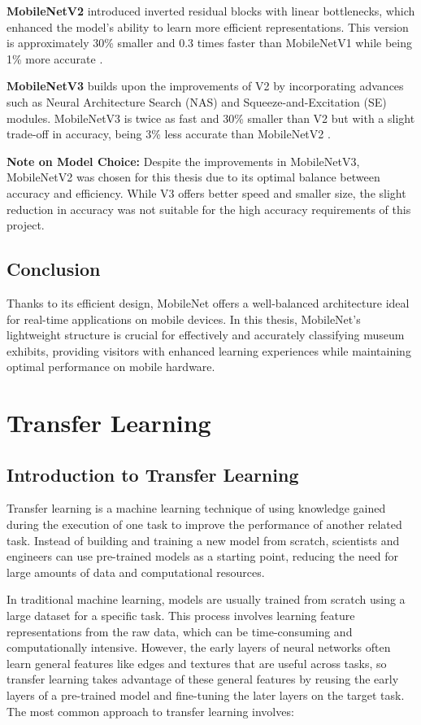 \textbf{MobileNetV2} introduced inverted residual blocks with linear bottlenecks, which enhanced the model's ability to learn more efficient representations. This version is approximately 30\% smaller and 0.3 times faster than MobileNetV1 while being 1\% more accurate \cite{pandrii_mobilenet}.

\textbf{MobileNetV3} builds upon the improvements of V2 by incorporating advances such as Neural Architecture Search (NAS) and Squeeze-and-Excitation (SE) modules. MobileNetV3 is twice as fast and 30\% smaller than V2 but with a slight trade-off in accuracy, being 3\% less accurate than MobileNetV2 \cite{pandrii_mobilenet}.

\textbf{Note on Model Choice:} Despite the improvements in MobileNetV3, MobileNetV2 was chosen for this thesis due to its optimal balance between accuracy and efficiency. While V3 offers better speed and smaller size, the slight reduction in accuracy was not suitable for the high accuracy requirements of this project.

\subsection{Conclusion}

Thanks to its efficient design, MobileNet offers a well-balanced architecture ideal for real-time applications on mobile devices. In this thesis, MobileNet's lightweight structure is crucial for effectively and accurately classifying museum exhibits, providing visitors with enhanced learning experiences while maintaining optimal performance on mobile hardware.

\section{Transfer Learning}

\subsection{Introduction to Transfer Learning}

Transfer learning is a machine learning technique of using knowledge gained during the execution of one task to improve the performance of another related task. Instead of building and training a new model from scratch, scientists and engineers can use pre-trained models as a starting point, reducing the need for large amounts of data and computational resources.

In traditional machine learning, models are usually trained from scratch using a large dataset for a specific task. This process involves learning feature representations from the raw data, which can be time-consuming and computationally intensive. However, the early layers of neural networks often learn general features like edges and textures that are useful across tasks, so transfer learning takes advantage of these general features by reusing the early layers of a pre-trained model and fine-tuning the later layers on the target task. The most common approach to transfer learning involves:

